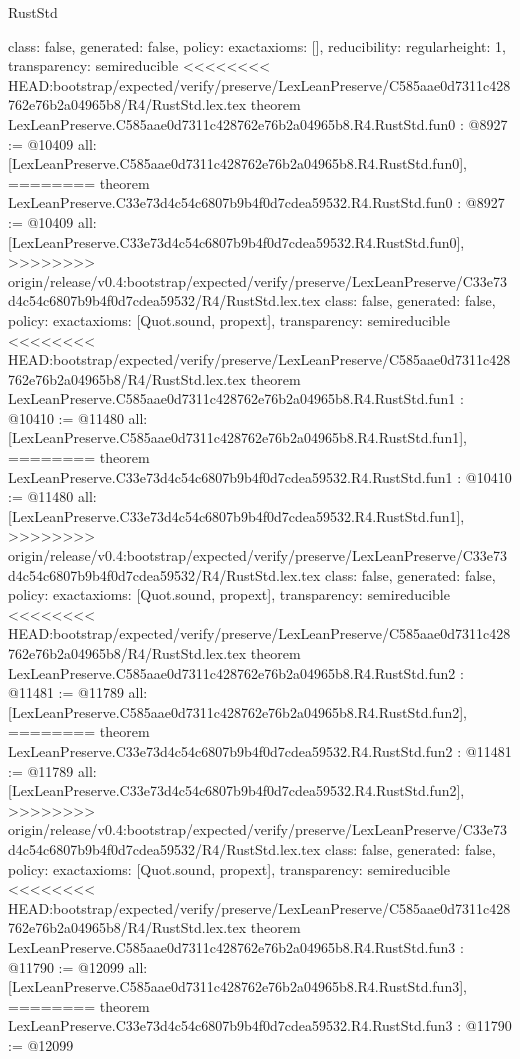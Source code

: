 \begin{lexlean}{RustStd}
\begin{coremodule}
{\begin{coremodule}
{{{  class: false,
  generated: false,
  policy: exact{axioms: []},
  reducibility: regular{height: 1},
  transparency: semireducible
}
<<<<<<<< HEAD:bootstrap/expected/verify/preserve/LexLeanPreserve/C585aae0d7311c428762e76b2a04965b8/R4/RustStd.lex.tex
theorem LexLeanPreserve.C585aae0d7311c428762e76b2a04965b8.R4.RustStd.fun0 : @8927 := @10409 {
  all: [LexLeanPreserve.C585aae0d7311c428762e76b2a04965b8.R4.RustStd.fun0],
========
theorem LexLeanPreserve.C33e73d4c54c6807b9b4f0d7cdea59532.R4.RustStd.fun0 : @8927 := @10409 {
  all: [LexLeanPreserve.C33e73d4c54c6807b9b4f0d7cdea59532.R4.RustStd.fun0],
>>>>>>>> origin/release/v0.4:bootstrap/expected/verify/preserve/LexLeanPreserve/C33e73d4c54c6807b9b4f0d7cdea59532/R4/RustStd.lex.tex
  class: false,
  generated: false,
  policy: exact{axioms: [Quot.sound, propext]},
  transparency: semireducible
}
<<<<<<<< HEAD:bootstrap/expected/verify/preserve/LexLeanPreserve/C585aae0d7311c428762e76b2a04965b8/R4/RustStd.lex.tex
theorem LexLeanPreserve.C585aae0d7311c428762e76b2a04965b8.R4.RustStd.fun1 : @10410 := @11480 {
  all: [LexLeanPreserve.C585aae0d7311c428762e76b2a04965b8.R4.RustStd.fun1],
========
theorem LexLeanPreserve.C33e73d4c54c6807b9b4f0d7cdea59532.R4.RustStd.fun1 : @10410 := @11480 {
  all: [LexLeanPreserve.C33e73d4c54c6807b9b4f0d7cdea59532.R4.RustStd.fun1],
>>>>>>>> origin/release/v0.4:bootstrap/expected/verify/preserve/LexLeanPreserve/C33e73d4c54c6807b9b4f0d7cdea59532/R4/RustStd.lex.tex
  class: false,
  generated: false,
  policy: exact{axioms: [Quot.sound, propext]},
  transparency: semireducible
}
<<<<<<<< HEAD:bootstrap/expected/verify/preserve/LexLeanPreserve/C585aae0d7311c428762e76b2a04965b8/R4/RustStd.lex.tex
theorem LexLeanPreserve.C585aae0d7311c428762e76b2a04965b8.R4.RustStd.fun2 : @11481 := @11789 {
  all: [LexLeanPreserve.C585aae0d7311c428762e76b2a04965b8.R4.RustStd.fun2],
========
theorem LexLeanPreserve.C33e73d4c54c6807b9b4f0d7cdea59532.R4.RustStd.fun2 : @11481 := @11789 {
  all: [LexLeanPreserve.C33e73d4c54c6807b9b4f0d7cdea59532.R4.RustStd.fun2],
>>>>>>>> origin/release/v0.4:bootstrap/expected/verify/preserve/LexLeanPreserve/C33e73d4c54c6807b9b4f0d7cdea59532/R4/RustStd.lex.tex
  class: false,
  generated: false,
  policy: exact{axioms: [Quot.sound, propext]},
  transparency: semireducible
}
<<<<<<<< HEAD:bootstrap/expected/verify/preserve/LexLeanPreserve/C585aae0d7311c428762e76b2a04965b8/R4/RustStd.lex.tex
theorem LexLeanPreserve.C585aae0d7311c428762e76b2a04965b8.R4.RustStd.fun3 : @11790 := @12099 {
  all: [LexLeanPreserve.C585aae0d7311c428762e76b2a04965b8.R4.RustStd.fun3],
========
theorem LexLeanPreserve.C33e73d4c54c6807b9b4f0d7cdea59532.R4.RustStd.fun3 : @11790 := @12099 {
}}}}}}}
\end{coremodule}}
\end{coremodule}
\end{lexlean}
